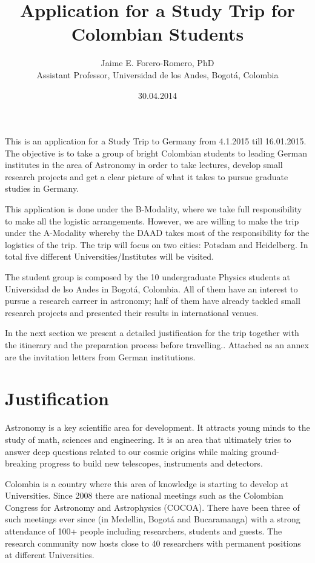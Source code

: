 \documentclass[12pt]{article}
\title{Application for a Study Trip for Colombian Students}
\author{Jaime E. Forero-Romero, PhD \\ {\small Assistant Professor,
    Universidad de los Andes, Bogot\'a, Colombia}}
\date{30.04.2014}
\begin{document}
\maketitle
This is an application for a Study Trip to Germany from 4.1.2015 till
16.01.2015. The objective is to take a group of bright Colombian students to
leading German institutes in the area of Astronomy in order to take lectures,
develop small research projects and get a clear picture of what it
takes to pursue graduate studies in Germany. 

This application is done under the B-Modality, where we take full
responsibility to make all the logistic arrangements. However, we are
willing to make the trip under the A-Modality whereby the DAAD takes
most of the responsibility for the logistics of the trip.  The trip will
focus on two cities: Potsdam and Heidelberg. In total  five different
Universities/Institutes will be visited. 
 
The student group is composed by the 10 undergraduate Physics students at
Universidad de lso Andes in Bogot\'a, Colombia. All of them have an
interest to pursue a research carreer in astronomy; half of them have
already tackled small research projects and presented their results in
international venues. 

In the next section we present a detailed justification for the trip
together with the itinerary and the preparation process before
travelling.. Attached as an annex are the invitation letters from
German institutions.

\newpage

\section{Justification}

Astronomy is a key scientific area for development. It attracts young
minds to the study of math, sciences and engineering. It is an area
that ultimately tries to answer deep questions related to our
cosmic origins while making ground-breaking progress to build new
telescopes, instruments and detectors.

Colombia is a country where this area of knowledge is starting to develop
at Universities. Since 2008 there are national meetings such as the
Colombian Congress for Astronomy and Astrophysics (COCOA). There have
been three of such meetings ever since (in Medellin, Bogot\'a and Bucaramanga)
with a strong attendance of 100+ people including researchers,
students and guests. The research community now hosts close to 40
researchers with permanent positions at different Universities.
\end{document}
